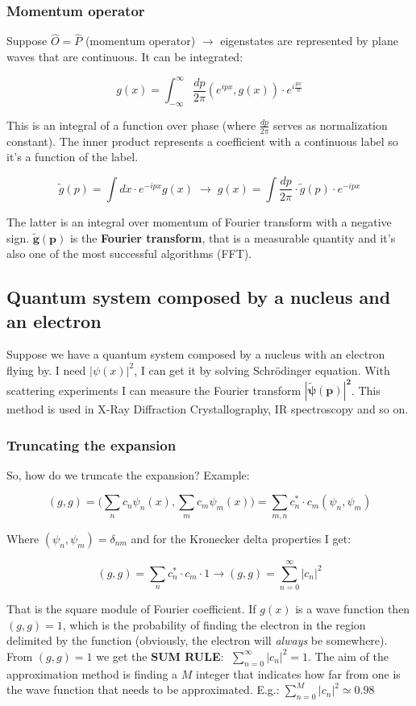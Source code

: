 		\subsubsection{Momentum operator}
		Suppose $\hat{O}=\hat{P}$ (momentum operator) $\rightarrow$ eigenstates are represented by plane waves that are continuous.
		It can be integrated:

		$$g(x)=\int_{-\infty}^{\infty}\frac{dp}{2\pi}(e^{ipx},g(x))\cdot e^{i\frac{px}{\hbar}}$$

		This is an integral of a function over phase (where $\frac{dp}{2\pi}$ serves as normalization constant).
		The inner product represents a coefficient with a continuous label so it's a function of the label.

		$$\tilde{g}(p)=\int dx\cdot e^{-ipx}g(x)\; \rightarrow \; g(x)=\int \frac{dp}{2\pi} \cdot \tilde{g}(p) \cdot e^{-ipx}$$

		The latter is an integral over momentum of Fourier transform with a negative sign.
		$\mathbf{\tilde{g}(p)}$ is the \textbf{Fourier transform}, that is a measurable quantity and it's also one of the most successful algorithms (FFT).

	\subsection{Quantum system composed by a nucleus and an electron}
	Suppose we have a quantum system composed by a nucleus with an electron flying by.
	I need $|\psi(x)|^2$, I can get it by solving Schr{\"o}dinger equation.
	With scattering experiments I can measure the Fourier transform $\mathbf{|\tilde{\psi}(p)|^2}$.
	This method is used in X-Ray Diffraction Crystallography, IR spectroscopy and so on.

		\subsubsection{Truncating the expansion}
		So, how do we truncate the expansion? Example:

		$$(g,g)=\biggl(\sum_nc_n\psi_n(x), \sum_mc_m\psi_m(x)\biggr) = \sum_{m,n}c_n^*\cdot c_m(\psi_n, \psi_m)$$

		Where $(\psi_n,\psi_m)=\delta_{nm}$ and for the Kronecker delta properties I get:

		$$(g,g)= \sum_nc_n^* \cdot c_m \cdot 1 \rightarrow (g,g)=\sum_{n=0}^{\infty}|c_n|^2$$

		That is the square module of Fourier coefficient.
		If $g(x)$ is a wave function then $(g,g)=1$, which is the probability of finding the electron in the region delimited by the function (obviously, the electron will \textit{always} be somewhere).
		From $(g,g)=1$ we get the \textbf{SUM RULE}: $\; \sum_{n=0}^{\infty}|c_n|^2=1$.
		The aim of the approximation method is finding a $M$ integer that indicates how far from one is the wave function that needs to be approximated.
		E.g.:$\; \sum_{n=0}^{M}|c_n|^2 \simeq 0.98$

